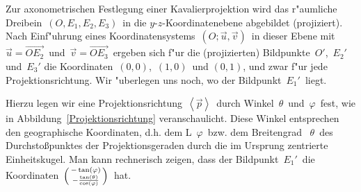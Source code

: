 
\small
\begin{Aufgabe}
\label{Analyse}%
\footnotesize%
Zur axonometrischen Festlegung einer Kavalierprojektion wird das r"aumliche Dreibein\, $(O, E_1, E_2, E_3)$\, in die $y$-$z$-Koordinatenebene abgebildet (projiziert). Nach Einf"uhrung eines Koordinatensystems\, $\left( O; \vec{u},\vec{v}\right)$\, in dieser Ebene mit\, $\vec{u} = \overrightarrow{O E_2}$\, und\, $\vec{v} = \overrightarrow{O E_3}$\, ergeben sich f"ur die (projizierten) Bildpunkte\, $O'$,\, $E_2'$\, und\, $E_3'$ die  Koordinaten\, $(0,0)$,\, $(1,0)$\, und $(0,1)$, und zwar f"ur jede Projektionsrichtung. Wir "uberlegen uns noch, wo der Bildpunkt\, $E_1'$\, liegt.

Hierzu legen wir eine Projektionsrichtung\, $\left\langle\vec{p}\right\rangle$\, durch Winkel\, $\theta$\, und\, $\varphi$\, fest, wie in Abbildung~\ref{Projektionsrichtung} veranschaulicht. Diese Winkel entsprechen den \glqq geographische Koordinaten\grqq, d.h. dem L\angengrad\, $\varphi$\, bzw. dem Breitengrad  \, $\theta$\, des Durchstoßpunktes der Projektionsgeraden durch die im Ursprung zentrierte Einheitskugel. Man kann rechnerisch zeigen, dass der Bildpunkt\, $E_1'$\, die Koordinaten\, $\begin{psmallmatrix} - \tan(\varphi) \\ - \frac{\tan(\theta)}{\cos(\varphi)} \end{psmallmatrix}$\, hat.


\end{Aufgabe}
